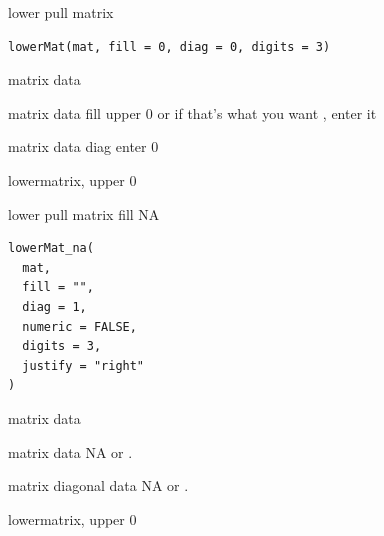 \documentclass[a4paper]{book}
\begin{document}
%
\begin{Description}
lower pull matrix
\end{Description}
%
\begin{Usage}
\begin{verbatim}
lowerMat(mat, fill = 0, diag = 0, digits = 3)
\end{verbatim}
\end{Usage}
%
\begin{Arguments}
\begin{ldescription}
\item[\code{mat}] matrix data

\item[\code{fill}] matrix data fill upper 0 or if that's what you want , enter it

\item[\code{diag}] matrix data diag enter 0
\end{ldescription}
\end{Arguments}
%
\begin{Value}
lowermatrix, upper 0
\end{Value}

%
\begin{Description}
lower pull matrix fill NA
\end{Description}
%
\begin{Usage}
\begin{verbatim}
lowerMat_na(
  mat,
  fill = "",
  diag = 1,
  numeric = FALSE,
  digits = 3,
  justify = "right"
)
\end{verbatim}
\end{Usage}
%
\begin{Arguments}
\begin{ldescription}
\item[\code{mat}] matrix data

\item[\code{fill}] matrix data NA or .

\item[\code{diag}] matrix  diagonal data NA or .
\end{ldescription}
\end{Arguments}
%
\begin{Value}
lowermatrix, upper 0
\end{Value}
\end{document}

